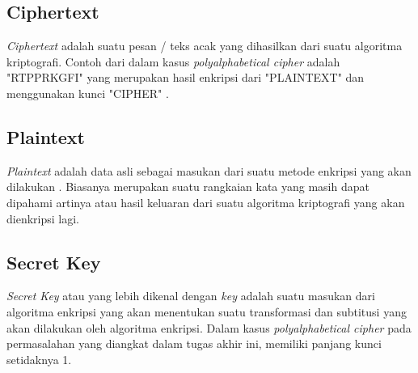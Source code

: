 	\subsection{Ciphertext}
	\textit{Ciphertext} adalah suatu pesan / teks acak yang dihasilkan dari suatu algoritma kriptografi. 
	Contoh dari \ciphertext dalam kasus \textit{polyalphabetical cipher} adalah "RTPPRKGFI" yang merupakan hasil enkripsi dari "PLAINTEXT" dan menggunakan kunci "CIPHER" \cite{william_crytography_2011}.
	
	\subsection{Plaintext}
	\textit{Plaintext} adalah data asli sebagai masukan dari suatu metode enkripsi yang akan dilakukan  \cite{william_crytography_2011}. Biasanya merupakan suatu rangkaian kata yang masih dapat dipahami artinya atau hasil keluaran dari suatu algoritma kriptografi yang akan dienkripsi lagi.
	
	\subsection{Secret Key}
	\textit{Secret Key} atau yang lebih dikenal dengan \textit{key} adalah suatu masukan dari algoritma enkripsi yang akan menentukan suatu transformasi dan subtitusi yang akan dilakukan oleh algoritma enkripsi\cite{william_crytography_2011}. Dalam kasus \textit{polyalphabetical cipher} pada permasalahan yang diangkat dalam tugas akhir ini, memiliki panjang kunci setidaknya 1. 
	
